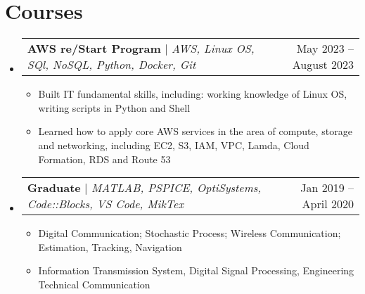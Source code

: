 \documentclass[letterpaper,11pt]{article}
\makeatletter
\newcommand{\resumeItem}[1]{
  \item\small{
    {#1 \vspace{-2pt}}
  }
}
\newcommand{\resumeProjectHeading}[2]{
    \item
    \begin{tabular*}{0.97\textwidth}{l@{\extracolsep{\fill}}r}
      \small#1 & #2 \\
    \end{tabular*}\vspace{-7pt}
}
\newcommand{\resumeSubHeadingListStart}{\begin{itemize}[leftmargin=0.15in, label={}]}
\newcommand{\resumeSubHeadingListEnd}{\end{itemize}}
\newcommand{\resumeItemListStart}{\begin{itemize}}
\newcommand{\resumeItemListEnd}{\end{itemize}\vspace{-5pt}}
\makeatother
\begin{document}
\section{Courses}
    \resumeSubHeadingListStart
      \resumeProjectHeading
          {\textbf{AWS re/Start Program} $|$ \emph{AWS, Linux OS,  SQl, NoSQL, Python, Docker, Git}}{May 2023 -- August 2023}
          \resumeItemListStart
            \resumeItem{Built IT fundamental skills, including: working knowledge of Linux OS, writing scripts in
            Python and Shell}
            \resumeItem{Learned how to apply core AWS services in the area of compute, storage and
            networking, including EC2, S3, IAM, VPC, Lamda, Cloud Formation, RDS and Route 53}
          \resumeItemListEnd
          \resumeProjectHeading
          {\textbf{Graduate} $|$ \emph{MATLAB, PSPICE, OptiSystems, Code::Blocks, VS Code, MikTex}}{Jan 2019 -- April 2020}
          \resumeItemListStart
            \resumeItem{Digital Communication; Stochastic Process; Wireless Communication; Estimation, Tracking, Navigation }
            \resumeItem{Information Transmission System, Digital Signal Processing, Engineering Technical Communication}
          \resumeItemListEnd
    \resumeSubHeadingListEnd
%
\end{document}
